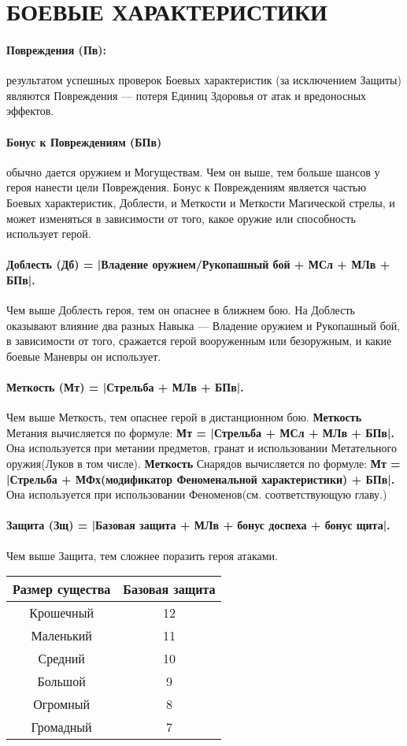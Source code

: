 \section{БОЕВЫЕ ХАРАКТЕРИСТИКИ}
\paragraph{Повреждения (Пв):} результатом успешных проверок Боевых характеристик (за исключением Защиты) являются Повреждения — потеря Единиц Здоровья от атак и вредоносных эффектов.
\paragraph{Бонус к Повреждениям (БПв)} обычно дается оружием и Могуществам. Чем он выше, тем больше шансов у героя нанести цели Повреждения. Бонус к Повреждениям является частью Боевых характеристик, Доблести, и Меткости и Меткости Магической стрелы, и может изменяться в зависимости от того, какое оружие или способность использует герой.
\paragraph{Доблесть (Дб) = |Владение оружием/Рукопашный бой + МСл + МЛв + БПв|.} Чем выше Доблесть героя, тем он опаснее в ближнем бою. На Доблесть оказывают влияние два разных Навыка — Владение оружием и Рукопашный бой, в зависимости от того, сражается герой вооруженным или безоружным, и какие боевые Маневры он использует.
\paragraph{Меткость (Мт) = |Стрельба + МЛв + БПв|.} Чем выше Меткость, тем опаснее герой в дистанционном бою.
\newline \textbf{Меткость} Метания вычисляется по формуле: \textbf{Мт = |Стрельба + МСл + МЛв + БПв|.} Она используется при метании предметов, гранат и использовании Метательного оружия(Луков в том числе).
\newline \textbf{Меткость} Снарядов вычисляется по формуле: \textbf{Мт = |Стрельба + МФх(модификатор Феноменальной характеристики) + БПв|.} Она используется при использовании Феноменов(см. соответствующую главу.)

\paragraph{Защита (Зщ) = |Базовая защита + МЛв + бонус доспеха + бонус щита|.} Чем выше Защита, тем сложнее поразить героя атаками.
\begin{center}
\begin{tabular}{ |c|c| }
\hline
\textbf{Размер существа} & \textbf{Базовая защита}
\\ \hline
Крошечный & 12
\\ \hline
Маленький & 11
\\ \hline
Средний & 10
\\ \hline
Большой & 9
\\ \hline
Огромный & 8
\\ \hline
Громадный & 7
\\ \hline
\end{tabular}
\end{center}
